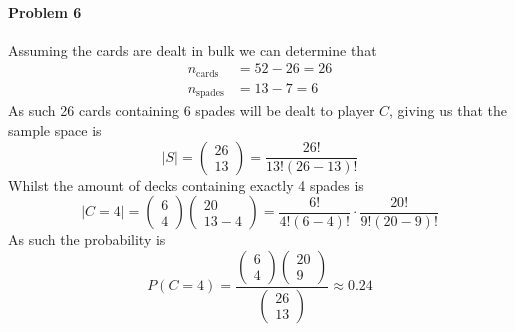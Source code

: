 \paragraph{Problem 6}
Assuming the cards are dealt in bulk we can determine that
\begin{align*}
    n_{\text{cards}}&=52-26=26 \\
    n_{\text{spades}}&=13-7=6
\end{align*}
As such 26 cards containing 6 spades will be dealt to player $C$, giving us that the sample space is
\[
    |S|=\begin{pmatrix}26\\13\end{pmatrix}=\frac{26!}{13!(26-13)!}
\]
Whilst the amount of decks containing exactly 4 spades is
\[
    |C=4|=\begin{pmatrix}6\\4\end{pmatrix}\begin{pmatrix}20\\13-4\end{pmatrix}=\frac{6!}{4!(6-4)!}\cdot\frac{20!}{9!(20-9)!}
\]
As such the probability is
\[
    P(C=4)=\frac{\begin{pmatrix}6\\4\end{pmatrix}\begin{pmatrix}20\\9\end{pmatrix}}{\begin{pmatrix}26\\13\end{pmatrix}}\approx 0.24
\]
